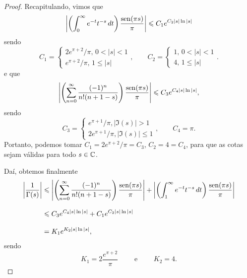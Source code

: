 \begin{proof}
        Recapitulando, vimos que
        \[
        \left| \left( \int_0^{\infty} e^{-t}t^{-s} \, dt \right)\frac{\operatorname{sen}(\pi s)}{\pi} \right| \leqslant C_1e^{C_2|s|\ln|s|}
        \]
        sendo
        \[
        C_1 = \begin{cases}
            2e^{\pi + 2}/\pi, \, 0 < |s| < 1 \\
            e^{\pi + 2}/\pi, \, 1\leq |s|
        \end{cases}, \qquad
        C_2 = \begin{cases}
            1, \, 0 < |s| < 1 \\
            4, \, 1\leq |s|
        \end{cases}.
        \]
        e que
        \[
        \left|\left(\sum_{n=0}^{\infty} \frac{(-1)^n}{n!(n+1-s)}\right)\frac{\operatorname{sen}(\pi s)}{\pi}\right| \leqslant C_3e^{C_4|s|\ln|s|},
        \]
        sendo
        \[
        C_3 = \begin{cases}
            e^{\pi + 1}/\pi, |\Im(s)| > 1 \\
            2e^{\pi + 1}/\pi, |\Im(s)| \leq 1
        \end{cases}, \qquad 
        C_4 = \pi.
        \]
        Portanto, podemos tomar $C_1 = 2e^{\pi + 2}/\pi = C_3$, $C_2 = 4 = C_4$,
        para que as cotas sejam
        válidas para todo $s\in\mathbb{C}$.
        
        Daí, obtemos finalmente
        \begin{align*}
            \left| \frac{1}{\Gamma(s)} \right| 
            &\leqslant \left|\left(\sum_{n=0}^{\infty} \frac{(-1)^n}{n!(n+1-s)}\right)\frac{\operatorname{sen}(\pi s)}{\pi}\right|
            + \left| \left( \int_1^{\infty} e^{-t} t^{-s} \, dt \right)\frac{\operatorname{sen}(\pi s)}{\pi} \right| \\[0.3cm]
            &\leqslant C_3e^{C_4|s|\ln|s|} + C_1e^{C_2|s|\ln|s|} \\[0.3cm]
            &= K_1e^{K_2|s|\ln|s|},
        \end{align*}
        sendo
        \[
        K_1 = 2\frac{e^{\pi + 2}}{\pi} \qquad \text{ e } \qquad K_2 = 4.
        \]
    \end{proof}
    
    \medskip
    
